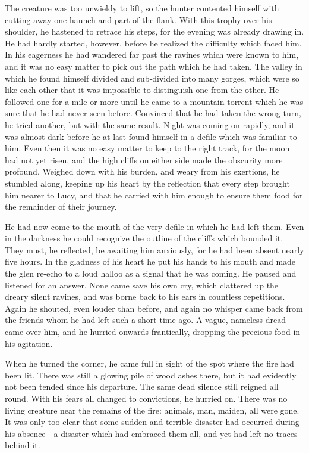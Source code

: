 \documentclass[12pt,english,oneside]{book}
\newcommand{\mdsh}[1]{\mbox{#1}\linebreak[1]}
\begin{document}
The creature was too unwieldy to lift, so the hunter contented himself
with cutting away one haunch and part of the flank. With this trophy
over his shoulder, he hastened to retrace his steps, for the evening
was already drawing in. He had hardly started, however, before he
realized the difficulty which faced him. In his eagerness he had wandered
far past the ravines which were known to him, and it was no easy matter
to pick out the path which he had taken. The valley in which he found
himself divided and sub-divided into many gorges, which were so like
each other that it was impossible to distinguish one from the other.
He followed one for a mile or more until he came to a mountain torrent
which he was sure that he had never seen before. Convinced that he
had taken the wrong turn, he tried another, but with the same result.
Night was coming on rapidly, and it was almost dark before he at last
found himself in a defile which was familiar to him. Even then it
was no easy matter to keep to the right track, for the moon had not
yet risen, and the high cliffs on either side made the obscurity more
profound. Weighed down with his burden, and weary from his exertions,
he stumbled along, keeping up his heart by the reflection that every
step brought him nearer to Lucy, and that he carried with him enough
to ensure them food for the remainder of their journey.

He had now come to the mouth of the very defile in which he had left
them. Even in the darkness he could recognize the outline of the cliffs
which bounded it. They must, he reflected, be awaiting him anxiously,
for he had been absent nearly five hours. In the gladness of his heart
he put his hands to his mouth and made the glen re-echo to a loud
halloo as a signal that he was coming. He paused and listened for
an answer. None came save his own cry, which clattered up the dreary
silent ravines, and was borne back to his ears in countless repetitions.
Again he shouted, even louder than before, and again no whisper came
back from the friends whom he had left such a short time ago. A vague,
nameless dread came over him, and he hurried onwards frantically,
dropping the precious food in his agitation.

When he turned the corner, he came full in sight of the spot where
the fire had been lit. There was still a glowing pile of wood ashes
there, but it had evidently not been tended since his departure. The
same dead silence still reigned all round. With his fears all changed
to convictions, he hurried on. There was no living creature near the
remains of the fire: animals, man, maiden, all were gone. It was only
too clear that some sudden and terrible disaster had occurred during
his absence\mdsh{---}a disaster which had embraced them all, and
yet had left no traces behind it.
\end{document}
